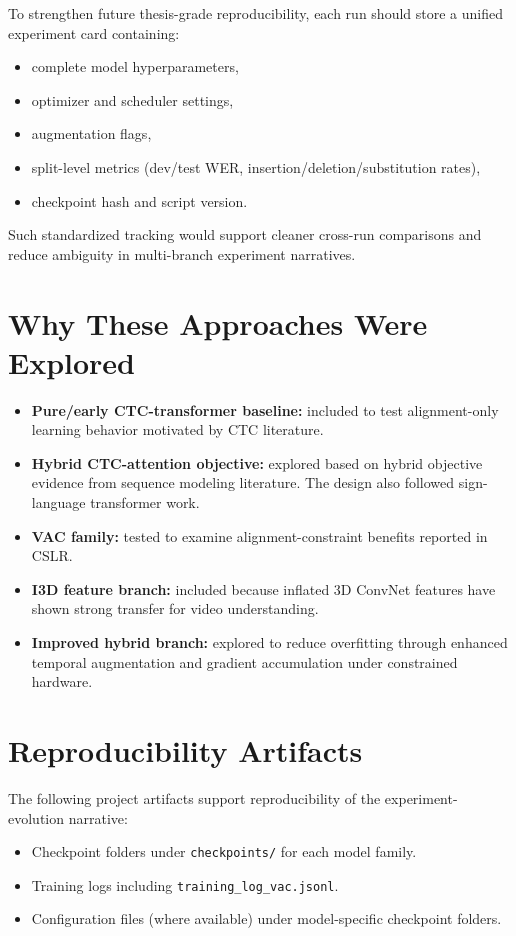 To strengthen future thesis-grade reproducibility, each run should store a unified experiment card containing:
\begin{itemize}
    \item complete model hyperparameters,
    \item optimizer and scheduler settings,
    \item augmentation flags,
    \item split-level metrics (dev/test WER, insertion/deletion/substitution rates),
    \item checkpoint hash and script version.
\end{itemize}

Such standardized tracking would support cleaner cross-run comparisons and reduce ambiguity in multi-branch experiment narratives.

\section{Why These Approaches Were Explored}

\begin{itemize}
    \item \textbf{Pure/early CTC-transformer baseline:} included to test alignment-only learning behavior motivated by CTC literature.\cite{graves2006connectionist}
    \item \textbf{Hybrid CTC-attention objective:} explored based on hybrid objective evidence from sequence modeling literature.\cite{watanabe2017hybrid} The design also followed sign-language transformer work.\cite{camgoz2020sign}
    \item \textbf{VAC family:} tested to examine alignment-constraint benefits reported in CSLR.\cite{zhu2021visual}
    \item \textbf{I3D feature branch:} included because inflated 3D ConvNet features have shown strong transfer for video understanding.\cite{carreira2017quo}
    \item \textbf{Improved hybrid branch:} explored to reduce overfitting through enhanced temporal augmentation and gradient accumulation under constrained hardware.
\end{itemize}

\section{Reproducibility Artifacts}

The following project artifacts support reproducibility of the experiment-evolution narrative:
\begin{itemize}
    \item Checkpoint folders under \texttt{checkpoints/} for each model family.
    \item Training logs including \texttt{training\_log\_vac.jsonl}.
    \item Configuration files (where available) under model-specific checkpoint folders.
\end{itemize}

